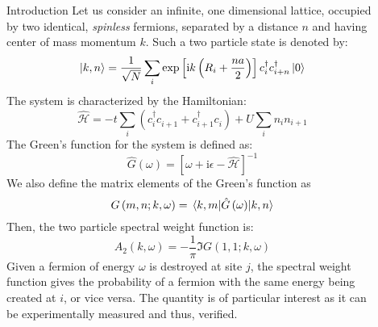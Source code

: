 \documentclass[final]{beamer}
\newlength{\sepwid}
\newlength{\onecolwid}
\newcommand{\I}{\mathrm{i}}
\begin{document}
\begin{frame}[t]
\begin{columns}[t]
\begin{column}{\onecolwid}
\begin{block}{Introduction}
Let us consider an infinite, one dimensional lattice, occupied by two identical, \textit{spinless} fermions, separated by a distance $n$ and having center of mass momentum $k$. Such a two particle state is denoted by:
\begin{equation}
\ket{k,n} = \frac{1}{\sqrt{N}} \sum_{i}\exp\left[ \I k \left( R_i + \frac{n a}{2}\right) \right]  c^{\dagger}_{i} c^{\dagger}_{i + n} \ket{0}
\end{equation}
The system is characterized by the Hamiltonian:
\begin{equation}\label{eqn:Hamiltonian}
\hat{\mathcal{H}} = -t \sum_{i}\left( c^{\dagger}_{i} c^{}_{i + 1} + c^{\dagger}_{i + 1} c^{}_{i} \right) + U \sum_{i} n_i n_{i + 1}
\end{equation}
The Green's function for the system is defined as:
\begin{equation}\label{eqn:GreenFunc}
\hat{G}\left(\omega\right) = \left[ \omega + \I \epsilon - \hat{\mathcal{H}} \right]^{-1}
\end{equation}
We also define the matrix elements of the Green's function as
\begin{equation}\label{eqn:GF_mel}
G\left(m, n; k, \omega \right) = \mel{k, m}{\hat{G}\left(\omega\right)}{k, n}
\end{equation}
Then, the two particle spectral weight function is:
\begin{equation}\label{eqn:SpectralWeight}
A_2 \left( k, \omega \right) = - \frac{1}{\pi} \Im{G\left(1, 1; k, \omega \right)}
\end{equation}
Given a fermion of energy $\omega$ is destroyed at site $j$, the spectral weight function gives the probability of a fermion with the same energy being created at $i$, or vice versa. The quantity is of particular interest as it can be experimentally measured and thus, verified.
\end{block}


\end{column} %

\begin{column}{\sepwid}\end{column} %


\begin{column}{\onecolwid} %
	

\end{column}
\end{columns}
\end{frame}
\end{document}
